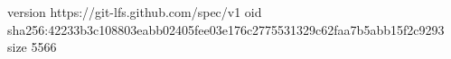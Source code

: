 version https://git-lfs.github.com/spec/v1
oid sha256:42233b3c108803eabb02405fee03e176c2775531329c62faa7b5abb15f2c9293
size 5566
